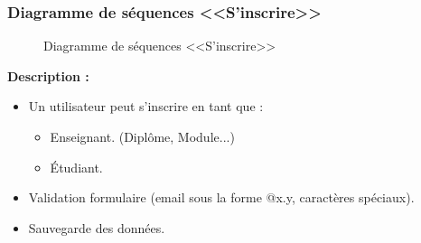\documentclass[12pt]{report}
\begin{document}
\newpage

\subsubsection{Diagramme de séquences <<S'inscrire>>}

\begin{figure}[h]
\centering
    \centerline{}
    \caption{Diagramme de séquences <<S'inscrire>>}
\end{figure}

\textbf{Description :}

\begin{itemize}
    \item Un utilisateur peut s'inscrire en tant que :
    \begin{itemize}
        \item Enseignant. (Diplôme, Module...)
        \item Étudiant.
    \end{itemize}
    \item Validation formulaire (email sous la forme @x.y, caractères spéciaux).
    \item Sauvegarde des données.
\end{itemize}
\end{document}
